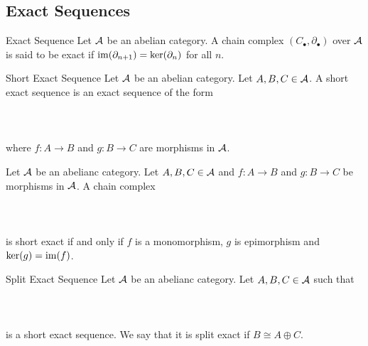 \documentclass[a4paper]{article}
\begin{document}
\subsection{Exact Sequences}
\begin{defn}{Exact Sequence}{} Let $\mathcal{A}$ be an abelian category. A chain complex $(C_\bullet,\partial_\bullet)$ over $\mathcal{A}$ is said to be exact if $\operatorname{im}(\partial_{n+1})=\ker(\partial_n)$ for all $n$. 
\end{defn}

\begin{defn}{Short Exact Sequence}{} Let $\mathcal{A}$ be an abelian category. Let $A,B,C\in\mathcal{A}$. A short exact sequence is an exact sequence of the form \\~\\
\\~\\
where $f:A\to B$ and $g:B\to C$ are morphisms in $\mathcal{A}$. 
\end{defn}

\begin{prp}{}{} Let $\mathcal{A}$ be an abelianc category. Let $A,B,C\in\mathcal{A}$ and $f:A\to B$ and $g:B\to C$ be morphisms in $\mathcal{A}$. A chain complex \\~\\
\\~\\
is short exact if and only if $f$ is a monomorphism, $g$ is epimorphism and $\ker(g)=\operatorname{im}(f)$. 
\end{prp}

\begin{defn}{Split Exact Sequence}{} Let $\mathcal{A}$ be an abelianc category. Let $A,B,C\in\mathcal{A}$ such that \\~\\
\\~\\
is a short exact sequence. We say that it is split exact if $B\cong A\oplus C$. 
\end{defn}
\end{document}
